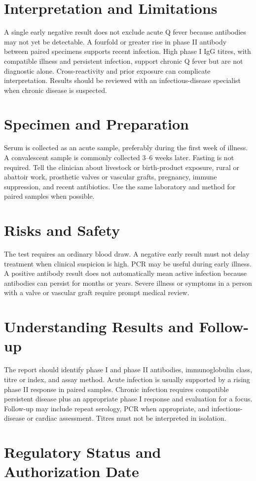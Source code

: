 \section*{Interpretation and Limitations}
A single early negative result does not exclude acute Q fever because antibodies may not yet be detectable. A fourfold or greater rise in phase II antibody between paired specimens supports recent infection. High phase I IgG titres, with compatible illness and persistent infection, support chronic Q fever but are not diagnostic alone. Cross-reactivity and prior exposure can complicate interpretation. Results should be reviewed with an infectious-disease specialist when chronic disease is suspected.
\section*{Specimen and Preparation}
Serum is collected as an acute sample, preferably during the first week of illness. A convalescent sample is commonly collected 3--6 weeks later. Fasting is not required. Tell the clinician about livestock or birth-product exposure, rural or abattoir work, prosthetic valves or vascular grafts, pregnancy, immune suppression, and recent antibiotics. Use the same laboratory and method for paired samples when possible.

\section*{Risks and Safety}
The test requires an ordinary blood draw. A negative early result must not delay treatment when clinical suspicion is high. PCR may be useful during early illness. A positive antibody result does not automatically mean active infection because antibodies can persist for months or years. Severe illness or symptoms in a person with a valve or vascular graft require prompt medical review.

\section*{Understanding Results and Follow-up}
The report should identify phase I and phase II antibodies, immunoglobulin class, titre or index, and assay method. Acute infection is usually supported by a rising phase II response in paired samples. Chronic infection requires compatible persistent disease plus an appropriate phase I response and evaluation for a focus. Follow-up may include repeat serology, PCR when appropriate, and infectious-disease or cardiac assessment. Titres must not be interpreted in isolation.

\section*{Regulatory Status and Authorization Date}

\clearpage
